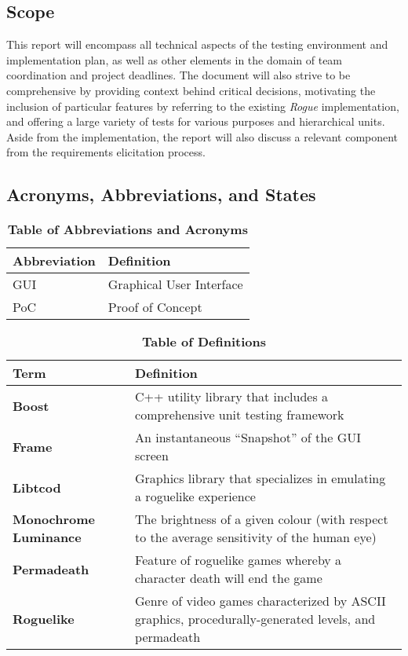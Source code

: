 \documentclass[12pt, titlepage]{article}
\begin{document}
	\subsection{Scope}
		This report will encompass all technical aspects of the testing environment and implementation plan, as well as other elements in the domain of team coordination and project deadlines.  The document will also strive to be comprehensive by providing context behind critical decisions, motivating the inclusion of particular features by referring to the existing \textit{Rogue} implementation, and offering a large variety of tests for various purposes and hierarchical units.  Aside from the implementation, the report will also discuss a relevant component from the requirements elicitation process.

	\subsection{Acronyms, Abbreviations, and States}
		
		\begin{table}[H]
			\centering
			\caption{\textbf{Table of Abbreviations and Acronyms}}
			\label{TableAbbreviations}
			\bigskip
			\begin{tabularx}{\textwidth}{p{3cm}X}
				\toprule
				\textbf{Abbreviation} & \textbf{Definition} \\
				\midrule
				GUI & Graphical User Interface\\
				PoC & Proof of Concept\\
				\bottomrule
			\end{tabularx}
		\end{table}

		\begin{table}[H]
			\centering
			\caption{\textbf{Table of Definitions}}
			\label{TableDefinitions}
			\bigskip
			\begin{tabularx}{\textwidth}{p{3.5cm}X}
				\toprule
				\textbf{Term} & \textbf{Definition}\\
				\midrule
				\textbf{Boost} & C++ utility library that includes a comprehensive unit testing framework\\
				\textbf{Frame} & An instantaneous ``Snapshot'' of the GUI screen\\
				\textbf{Libtcod} & Graphics library that specializes in emulating a roguelike experience\\
				\textbf{Monochrome Luminance} & The brightness of a given colour (with respect to the average sensitivity of the human eye)\\
				\textbf{Permadeath} & Feature of roguelike games whereby a character death will end the game\\
				\textbf{Roguelike} & Genre of video games characterized by ASCII graphics, procedurally-generated levels, and permadeath\\
				\bottomrule
			\end{tabularx}
		\end{table}	
\end{document}
